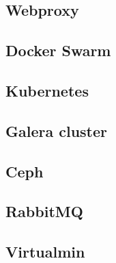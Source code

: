 		\subsection{Webproxy}
		\subsection{Docker Swarm}
		\subsection{Kubernetes}
		\subsection{Galera cluster}
		\subsection{Ceph}
		\subsection{RabbitMQ}
		\subsection{Virtualmin}
		